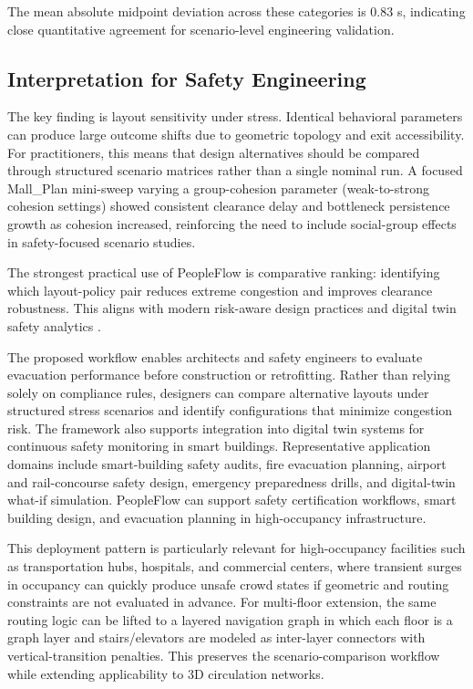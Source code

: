 \documentclass[utf8]{FrontiersinHarvard}
\begin{document}
The mean absolute midpoint deviation across these categories is 0.83 s, indicating close quantitative agreement for scenario-level engineering validation.

\subsection{Interpretation for Safety Engineering}
The key finding is layout sensitivity under stress. Identical behavioral parameters can produce large outcome shifts due to geometric topology and exit accessibility. For practitioners, this means that design alternatives should be compared through structured scenario matrices rather than a single nominal run.
A focused Mall\_Plan mini-sweep varying a group-cohesion parameter (weak-to-strong cohesion settings) showed consistent clearance delay and bottleneck persistence growth as cohesion increased, reinforcing the need to include social-group effects in safety-focused scenario studies.

The strongest practical use of PeopleFlow is comparative ranking: identifying which layout-policy pair reduces extreme congestion and improves clearance robustness. This aligns with modern risk-aware design practices and digital twin safety analytics \cite{haghani2020,kuligowski}.

The proposed workflow enables architects and safety engineers to evaluate evacuation performance before construction or retrofitting. Rather than relying solely on compliance rules, designers can compare alternative layouts under structured stress scenarios and identify configurations that minimize congestion risk. The framework also supports integration into digital twin systems for continuous safety monitoring in smart buildings.
Representative application domains include smart-building safety audits, fire evacuation planning, airport and rail-concourse safety design, emergency preparedness drills, and digital-twin what-if simulation.
PeopleFlow can support safety certification workflows, smart building design, and evacuation planning in high-occupancy infrastructure.

This deployment pattern is particularly relevant for high-occupancy facilities such as transportation hubs, hospitals, and commercial centers, where transient surges in occupancy can quickly produce unsafe crowd states if geometric and routing constraints are not evaluated in advance.
For multi-floor extension, the same routing logic can be lifted to a layered navigation graph in which each floor is a graph layer and stairs/elevators are modeled as inter-layer connectors with vertical-transition penalties. This preserves the scenario-comparison workflow while extending applicability to 3D circulation networks.
\end{document}
